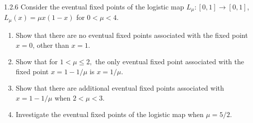 \begin{problem}{1.2.6}
  Consider the eventual fixed points of the logistic map $L_{\mu}: [0,1] \to [0,1]$,
  $L_\mu(x)  = \mu x (1-x)$ for $0 < \mu < 4$.
  \begin{enumerate}
    \item Show that there are no eventual fixed points associated with the fixed
      point $x=0$, other than $x=1$.
    \item Show that for $1 < \mu \leq 2,$ the only eventual fixed point associated
      with the fixed point $x = 1 - 1/\mu$ is $x = 1/\mu$.
    \item Show that there are additional eventual fixed points associated with $x = 1 - 1/\mu$
      when $2 < \mu < 3$.
    \item Investigate the eventual fixed points of the logistic map when $\mu = 5/2$.
  \end{enumerate}
\end{problem}

